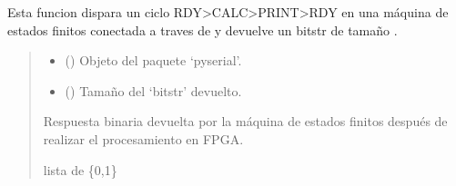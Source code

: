\documentclass[letterpaper,10pt,english]{sphinxmanual}
\begin{document}
\begin{fulllineitems}
\label{\detokenize{fpga.interfaz_pcps:fpga.interfaz_pcps.calc}}
\pysigstartsignatures
{}
\pysigstopsignatures
\sphinxAtStartPar
Esta funcion dispara un ciclo RDY\sphinxhyphen{}\textgreater{}CALC\sphinxhyphen{}\textgreater{}PRINT\sphinxhyphen{}\textgreater{}RDY en una máquina de estados finitos conectada a traves de  y devuelve un bitstr de tamaño .
\begin{quote}\begin{description}
\begin{itemize}
\item {} 
\sphinxAtStartPar
{} () \textendash{} Objeto  del paquete ‘pyserial’.

\item {} 
\sphinxAtStartPar
{} () \textendash{} Tamaño del ‘bitstr’ devuelto.

\end{itemize}

\sphinxAtStartPar
Respuesta binaria devuelta por la máquina de estados finitos después de realizar el procesamiento en FPGA.

\sphinxAtStartPar
lista de \{0,1\}

\end{description}\end{quote}

\end{fulllineitems}

\end{document}

